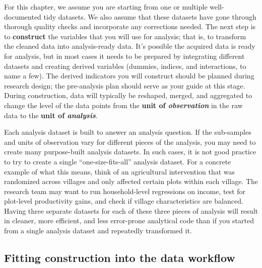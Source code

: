 For this chapter, we assume you are starting from
one or multiple well-documented tidy datasets.
We also assume that these datasets
have gone through thorough quality checks
and incorporate any corrections needed.
The next step is to \textbf{construct}
the variables that you will use for analysis;
that is, to transform the cleaned data into analysis-ready data.
It's possible the acquired data is ready for analysis,
but in most cases it needs to be prepared by integrating different datasets
and creating derived variables
(dummies, indices, and interactions, to name a few).
The derived indicators you will construct should be
planned during research design;
the pre-analysis plan should serve as your guide
at this stage.
During construction, data will typically be
reshaped, merged, and aggregated to change the level of the data points
from the \textbf{unit of \textit{observation}} in the raw data
to the \textbf{unit of \textit{analysis}}.

Each analysis dataset is built to answer an analysis question.
If the sub-samples and units of observation
vary for different pieces of the analysis,
you may need to create many purpose-built analysis datasets.
In such cases, it is not good practice
to try to create a single ``one-size-fits-all'' analysis dataset.
For a concrete example of what this means,
think of an agricultural intervention
that was randomized across villages
and only affected certain plots within each village.
The research team may want to
run household-level regressions on income,
test for plot-level productivity gains,
and check if village characteristics are balanced.
Having three separate datasets for each of these three pieces of analysis
will result in cleaner, more efficient, and less error-prone analytical code than if
you started from a single analysis dataset and repeatedly transformed it.

\subsection{Fitting construction into the data workflow}

